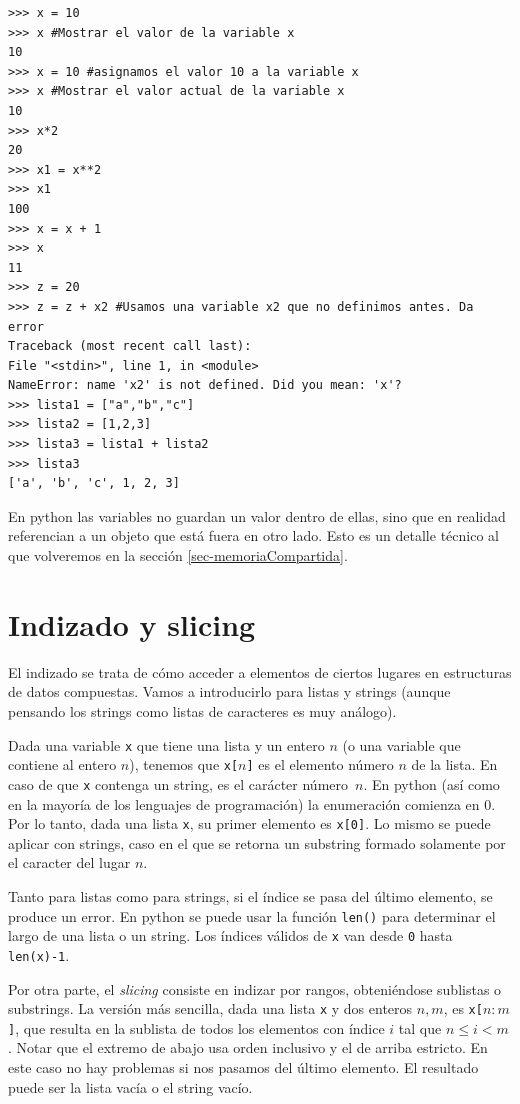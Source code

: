 \documentclass[a4paper, 12pt]{report}
\theoremstyle{definition}
\begin{document}
\begin{verbatim}
>>> x = 10
>>> x #Mostrar el valor de la variable x
10
>>> x = 10 #asignamos el valor 10 a la variable x
>>> x #Mostrar el valor actual de la variable x
10
>>> x*2
20
>>> x1 = x**2
>>> x1
100
>>> x = x + 1
>>> x
11
>>> z = 20
>>> z = z + x2 #Usamos una variable x2 que no definimos antes. Da error
Traceback (most recent call last):
File "<stdin>", line 1, in <module>
NameError: name 'x2' is not defined. Did you mean: 'x'?
>>> lista1 = ["a","b","c"]
>>> lista2 = [1,2,3]
>>> lista3 = lista1 + lista2
>>> lista3
['a', 'b', 'c', 1, 2, 3]
\end{verbatim}
En python las variables no guardan un valor dentro de ellas, sino que en realidad referencian a un objeto que está fuera en otro lado. Esto es un detalle técnico al que volveremos en la sección \ref{sec-memoriaCompartida}.
\section{Indizado y slicing}

El indizado se trata de cómo acceder a elementos de ciertos lugares en estructuras de datos compuestas. Vamos a introducirlo para listas y strings (aunque pensando los strings como listas de caracteres es muy análogo).

Dada una variable {\tt x} que tiene una lista y un entero $n$ (o una variable que contiene al entero $n$), tenemos que {\tt x[$n$]} es el elemento número $n$ de la lista. En caso de que {\tt x} contenga un string, es el carácter número~$n$. En python (así como en la mayoría de los lenguajes de programación) la enumeración comienza en 0. Por lo tanto, dada una lista {\tt x}, su primer elemento es {\tt x[0]}. Lo mismo se puede aplicar con strings, caso en el que se retorna un substring formado solamente por el caracter del lugar $n$.

Tanto para listas como para strings, si el índice se pasa del último elemento, se produce un error. En python se puede usar la función {\tt len()} para determinar el largo de una lista o un string. Los índices válidos de {\tt x} van desde {\tt 0} hasta {\tt len(x)-1}.

Por otra parte, el {\sl slicing} consiste en indizar por rangos, obteniéndose sublistas o substrings. La versión más sencilla, dada una lista {\tt x} y dos enteros $n,m$, es {\tt x[$n:m$]}, que resulta en la sublista de todos los elementos con índice $i$ tal que $n\leq i < m$. Notar que el extremo de abajo usa orden inclusivo y el de arriba estricto. En este caso no hay problemas si nos pasamos del último elemento. El resultado puede ser la lista vacía o el string vacío.
\end{document}
